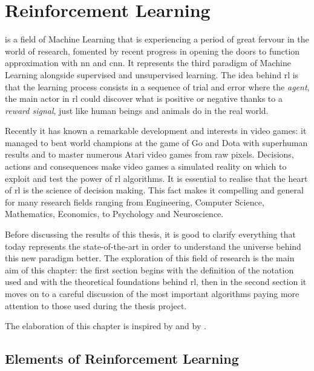 \chapter{Reinforcement Learning}

 is a field of Machine Learning that is experiencing a period of great fervour in the world of research, fomented by recent progress in  opening the doors to function approximation with \gls{nn} and \gls{cnn}. It represents the third paradigm of Machine Learning alongside supervised and unsupervised learning. The idea behind \gls{rl} is that the learning process consists in a sequence of trial and error where the \textit{agent}, the main actor in \gls{rl} could discover what is positive or negative thanks to a \textit{reward signal}, just like human beings and animals do in the real world. 

Recently it has known a remarkable development and interests in video games: it managed to beat world champions at the game of Go \cite{silver2016mastering} and Dota with superhuman results and to master numerous Atari video games \cite{mnih2013playing} from raw pixels. Decisions, actions and consequences make video games a simulated reality on which to exploit and test the power of \gls{rl} algorithms.
It is essential to realise that the heart of \gls{rl} is the science of decision making. This fact makes it compelling and general for many research fields ranging from Engineering, Computer Science, Mathematics, Economics, to Psychology and Neuroscience.

Before discussing the results of this thesis, it is good to clarify everything that today represents the state-of-the-art in order to understand the universe behind this new paradigm better.
The exploration of this field of research is the main aim of this chapter: the first section begins with the definition of the notation used and with the theoretical foundations behind \gls{rl}, then in the second section it moves on to a careful discussion of the most important algorithms paying more attention to those used during the thesis project.

The elaboration of this chapter is inspired by \cite{silver2015lectures} and by \cite{sutton2018reinforcement}.

\section{Elements of Reinforcement Learning}

